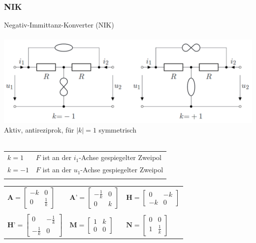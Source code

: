\documentclass[a4paper,twocolumn,10pt]{article}
\begin{document}
\subsubsection*{NIK}
Negativ-Immittanz-Konverter (NIK)\\\\
\includegraphics[width=1\linewidth, keepaspectratio]{Grafiken/NIK.png}
Aktiv, antireziprok, für $|k|=1$ symmetrisch\\\\
\begin{tabular}{ll}
$k=1$ & $F$ ist an der $i_1$-Achse gespiegelter Zweipol\\
$k=-1$ & $F$ ist an der $u_1$-Achse gespiegelter Zweipol\\\\
\end{tabular}
\begin{tabular}{lll}
$\textbf{A}=\begin{bmatrix}-k & 0\\ 0 & \frac{1}{k}\end{bmatrix}$ & $\textbf{A'}=\begin{bmatrix}-\frac{1}{k} & 0\\ 0 & k\end{bmatrix}$ & $\textbf{H}=\begin{bmatrix}0 & -k\\ -k & 0\end{bmatrix}$\\\\
$\textbf{H'}=\begin{bmatrix}0 & -\frac{1}{k}\\ -\frac{1}{k} & 0\end{bmatrix}$ & $\textbf{M}=\begin{bmatrix}1 & k\\ 0 & 0\end{bmatrix}$ & $\textbf{N}=\begin{bmatrix}0 & 0\\ 1 & \frac{1}{k}\end{bmatrix}$
\end{tabular}
\end{document}

